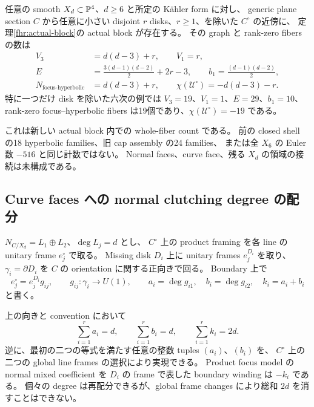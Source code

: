 \begin{corollary}[一般型超曲面の場合]\label{fhr:hypersurface}
任意の smooth $X_d\subset\mathbb P^4$、$d\ge6$ と所定の K\"ahler form に対し、
generic plane section $C$ から任意に小さい disjoint $r$ disks、$r\ge1$、を除いた $C^\circ$ の近傍に、
定理\ref{fhr:actual-block}の actual block が存在する。
その graph と rank-zero fibers の数は
\begin{equation}\label{fhr:degree-counts}
 \begin{split}
 V_3&=d(d-3)+r,\qquad V_1=r,\\
 E&=\frac{3(d-1)(d-2)}2+2r-3,\qquad
 b_1=\frac{(d-1)(d-2)}2,\\
 N_{\mathrm{focus\text{-}hyperbolic}}&=d(d-3)+r,
 \qquad \chi(\mathcal U^\circ)=-d(d-3)-r.
 \end{split}
\end{equation}
特に一つだけ disk を除いた六次の例では $V_3=19$、$V_1=1$、$E=29$、$b_1=10$、
rank-zero focus--hyperbolic fibers は19個であり、$\chi(\mathcal U^\circ)=-19$ である。
\end{corollary}

これは新しい actual block 内での whole-fiber count である。
前の closed shell の18 hyperbolic families、旧 cap assembly の24 families、
または全 $X_6$ の Euler 数 $-516$ と同じ計数ではない。
Normal faces、curve face、残る $X_d$ の領域の接続は未構成である。

\subsection{Curve faces への normal clutching degree の配分}

$N_{C/X_d}=L_1\oplus L_2$、$\deg L_j=d$ とし、
$C^\circ$ 上の product framing を各 line の unitary frame $e_j^\circ$ で取る。
Missing disk $D_i$ 上に unitary frames $e_j^{D_i}$ を取り、
$\gamma_i=\partial D_i$ を $C$ の orientation に関する正向きで回る。
Boundary 上で
\begin{equation}\label{fhr:clutching}
 e_j^\circ=e_j^{D_i}g_{ij},\qquad g_{ij}:\gamma_i\to U(1),
 \qquad a_i=\deg g_{i1},\quad b_i=\deg g_{i2},\quad k_i=a_i+b_i
\end{equation}
と書く。

\begin{proposition}\label{fhr:clutching-degree}
上の向きと convention において
\begin{equation}\label{fhr:clutching-numbers}
 \sum_{i=1}^r a_i=d,\qquad
 \sum_{i=1}^r b_i=d,\qquad
 \sum_{i=1}^r k_i=2d.
\end{equation}
逆に、最初の二つの等式を満たす任意の整数 tuples $(a_i)$、$(b_i)$ を、
$C^\circ$ 上の二つの global line frames の選択により実現できる。
Product focus model の normal mixed coefficient を $D_i$ の frame で表した boundary winding は $-k_i$ である。
個々の degree は再配分できるが、global frame changes により総和 $2d$ を消すことはできない。
\end{proposition}

